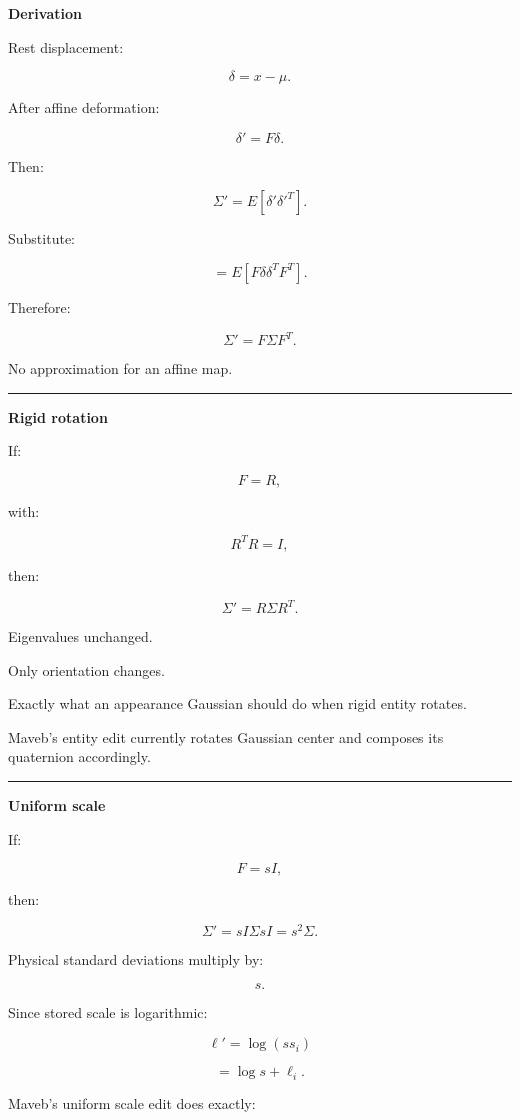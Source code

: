 \textbf{Derivation}

Rest displacement:

\[
\delta=x-\mu.
\]

After affine deformation:

\[
\delta'
=
F\delta.
\]

Then:

\[
\Sigma'
=
E[
\delta'\delta'^T
].
\]

Substitute:

\[
=
E[
F\delta
\delta^T
F^T
].
\]

Therefore:

\[
\boxed{
\Sigma'
=
F\Sigma F^T.
}
\]

No approximation for an affine map.

\begin{center}\rule{0.5\linewidth}{0.5pt}\end{center}

\textbf{Rigid rotation}

If:

\[
F=R,
\]

with:

\[
R^TR=I,
\]

then:

\[
\Sigma'
=
R\Sigma R^T.
\]

Eigenvalues unchanged.

Only orientation changes.

Exactly what an appearance Gaussian should do when rigid entity rotates.

Maveb's entity edit currently rotates Gaussian center and composes its quaternion accordingly.

\begin{center}\rule{0.5\linewidth}{0.5pt}\end{center}

\textbf{Uniform scale}

If:

\[
F=sI,
\]

then:

\[
\Sigma'
=
sI\Sigma sI
=
\boxed{s^2\Sigma}.
\]

Physical standard deviations multiply by:

\[
s.
\]

Since stored scale is logarithmic:

\[
\ell'=
\log(ss_i)
\]

\[
=
\log s+\ell_i.
\]

Maveb's uniform scale edit does exactly:

